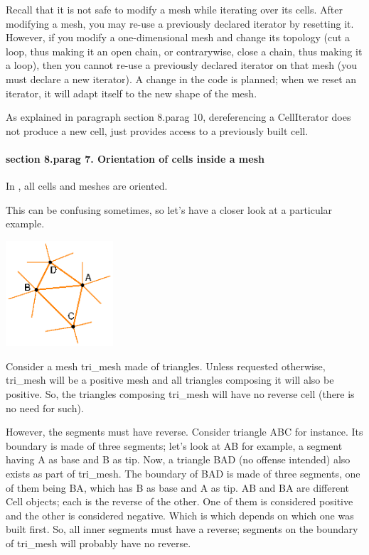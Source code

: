 {Recall that it is not safe to modify a mesh while iterating over its cells.
After modifying a mesh, you may re-use a previously declared iterator by {\codett reset}ting it.
However, if you modify a one-dimensional mesh and change its topology
(cut a loop, thus making it an open chain, or contrarywise, close a chain,
thus making it a loop), then you cannot re-use
a previously declared iterator on that mesh (you must declare a new iterator).
A change in the code is planned; when we {\codett reset} an iterator, it will adapt itself
to the new shape of the mesh.

As explained in paragraph \numb section 8.\numb parag 10, dereferencing a {\codett CellIterator}
does not produce a new cell, just provides access to a previously built cell.


\paragraph{\numb section 8.\numb parag 7. Orientation of cells inside a mesh}

In \maniFEM, all cells and meshes are oriented.

This can be confusing sometimes, so let's have a closer look at a particular example.

{ 
\centerline{\includegraphics[width=4cm]{malha-tri.eps}} }

Consider a mesh {\codett tri\_mesh} made of triangles.
Unless requested otherwise, {\codett tri\_mesh} will be a positive mesh and all triangles
composing it will also be positive.
So, the triangles composing {\codett tri\_mesh} will have no reverse cell
(there is no need for such).

However, the segments must have reverse.
Consider triangle {\codett ABC} for instance.
Its boundary is made of three segments; let's look at {\codett AB} for example,
a segment having {\codett A} as base and {\codett B} as tip.
Now, a triangle {\codett BAD} (no offense intended) also exists as part of {\codett tri\_mesh}.
The boundary of {\codett BAD} is made of three segments, one of them being {\codett BA},
which has {\codett B} as base and {\codett A} as tip.
{\codett AB} and {\codett BA} are different {\codett Cell} objects;
each is the reverse of the other.
One of them is considered positive and the other is considered negative.
Which is which depends on which one was built first.
So, all inner segments must have a reverse;
segments on the boundary of {\codett tri\_mesh} will probably have no reverse.

}
